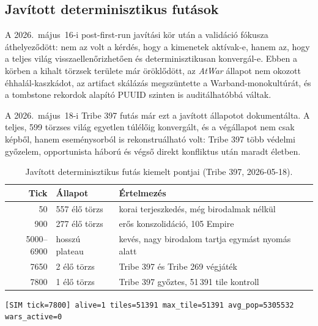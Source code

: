 \subsection*{Javított determinisztikus futások}

A 2026.~május~16-i post-first-run javítási kör után a validáció fókusza áthelyeződött:
nem az volt a kérdés, hogy a kimenetek aktívak-e, hanem az, hogy a teljes világ
visszaellenőrizhetően és determinisztikusan konvergál-e. Ebben a körben a kihalt törzsek
területe már öröklődött, az \textit{AtWar} állapot nem okozott éhhalál-kaszkádot,
az artifact skálázás megszüntette a Warband-monokultúrát, és a tombstone rekordok
alapító PUUID szinten is auditálhatóbbá váltak.

A 2026.~május~18-i Tribe 397 futás már ezt a javított állapotot dokumentálta. A teljes,
599 törzses világ egyetlen túlélőig konvergált, és a végállapot nem csak képből, hanem
eseménysorból is rekonstruálható volt: Tribe 397 több védelmi győzelem, opportunista
háború és végső direkt konfliktus után maradt életben.

\begin{table}[h]
\centering
\caption{Javított determinisztikus futás kiemelt pontjai (Tribe 397, 2026-05-18).}
\label{tab:tribe397-validation}
\begin{tabular}{rlp{7.2cm}}
\hline
\textbf{Tick} & \textbf{Állapot} & \textbf{Értelmezés} \\
\hline
50   & 557 élő törzs & korai terjeszkedés, még birodalmak nélkül \\
900  & 277 élő törzs & erős konszolidáció, 105 Empire \\
5000--6900 & hosszú plateau & kevés, nagy birodalom tartja egymást nyomás alatt \\
7650 & 2 élő törzs & Tribe 397 és Tribe 269 végjáték \\
7800 & 1 élő törzs & Tribe 397 győztes, 51\,391 tile kontroll \\
\hline
\end{tabular}
\end{table}

\begin{lstlisting}[language={},caption={Javított végállapot-részlet a Tribe 397 futásból}]
[SIM tick=7800] alive=1 tiles=51391 max_tile=51391 avg_pop=5305532 wars_active=0
\end{lstlisting}

